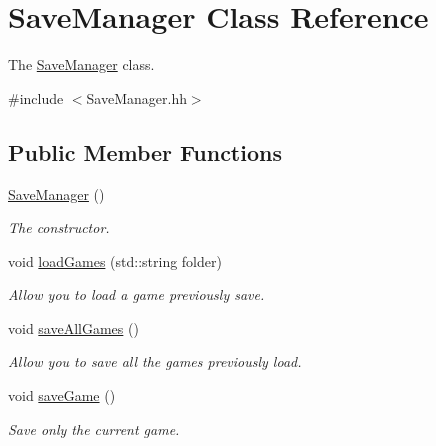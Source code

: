 \hypertarget{classSaveManager}{}\section{Save\+Manager Class Reference}
\label{classSaveManager}


The \hyperlink{classSaveManager}{Save\+Manager} class.  




{\ttfamily \#include $<$Save\+Manager.\+hh$>$}

\subsection*{Public Member Functions}
\begin{DoxyCompactItemize}
\item 
\mbox{\label{classSaveManager_ab8bb791be648b9b91db44aa11f6e8e14}} 
\hyperlink{classSaveManager_ab8bb791be648b9b91db44aa11f6e8e14}{Save\+Manager} ()
\begin{DoxyCompactList}\small\item\em The constructor. \end{DoxyCompactList}\item 
void \hyperlink{classSaveManager_a96c17debbf9765e8c71e74010621585f}{load\+Games} (std\+::string folder)
\begin{DoxyCompactList}\small\item\em Allow you to load a game previously save. \end{DoxyCompactList}\item 
\mbox{\label{classSaveManager_abdc44f23de421540c0a201083eccc327}} 
void \hyperlink{classSaveManager_abdc44f23de421540c0a201083eccc327}{save\+All\+Games} ()
\begin{DoxyCompactList}\small\item\em Allow you to save all the games previously load. \end{DoxyCompactList}\item 
\mbox{\label{classSaveManager_a6f5a49208d165ccaf6ef619f7005da55}} 
void \hyperlink{classSaveManager_a6f5a49208d165ccaf6ef619f7005da55}{save\+Game} ()
\begin{DoxyCompactList}\small\item\em Save only the current game. \end{DoxyCompactList}\item 

\end{DoxyCompactItemize}
